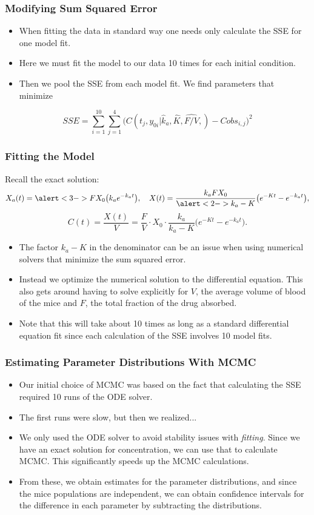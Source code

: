 \documentclass[t]{beamer}
\begin{document}
\begin{frame}
  \frametitle{Modifying Sum Squared Error}
  \begin{itemize}
    \item When fitting the data in standard way one needs only calculate the SSE for \alert{one} model fit.
    \item Here we must fit the model to our data \alert{10 times} for each initial condition.
    \item Then we pool the SSE from each model fit. We find parameters that minimize
  \end{itemize}
  $$
    SSE = \sum_{i=1}^{10} \sum_{j=1}^4 \big(C(t_j,y_{0i}|\hat k_a,\hat K,\widehat{F/V},) - Cobs_{i,j}\big)^2
  $$
\end{frame}

\begin{frame}
  \frametitle{Fitting the Model}  
  Recall the exact solution:
  $$
  X_a(t) = \alert<3->{F}X_0 \big( k_ae^{-k_at} \big), \quad
  X(t) = \frac{k_a F X_0}{\alert<2->{k_a - K}}\big( e^{-Kt} - e^{-k_a t}\big),
  $$
$$C(t) = \frac{X(t)}{V} = \frac{F}{V} \cdot X_0 \cdot \frac{k_a}{k_a -K}\big( e^{-Kt} - e^{-k_a t}\big).$$
\pause
\begin{itemize}
\item The factor \alert{$k_a - K$} in the denominator can be an issue when using
numerical solvers that minimize the sum squared error.
\pause
\item Instead we optimize the numerical solution to the differential equation. This also gets around having to solve explicitly for $V$, the average volume of blood of the mice and $F$, the total fraction of the drug absorbed. 
\pause
\item Note that this will take about 10 times as long as a standard differential equation fit since each calculation of the SSE involves 10 model fits.
\end{itemize}
\end{frame}

\begin{frame}
  \frametitle{Estimating Parameter Distributions With MCMC}
\begin{itemize}
  \item Our initial choice of MCMC was based on the fact that calculating the SSE required 10 runs of the ODE solver.
  \item The first runs were slow, but then we realized...
  \pause
  \item We only used the ODE solver to avoid stability issues with \emph{fitting}.  Since we have an exact solution for concentration, we can use that to calculate MCMC.  This significantly speeds up the MCMC calculations.
  \item From these, we obtain estimates for the parameter distributions, and since the mice populations are independent, we can obtain confidence intervals for the difference in each parameter by subtracting the distributions.
\end{itemize}
\end{frame}
\end{document}
